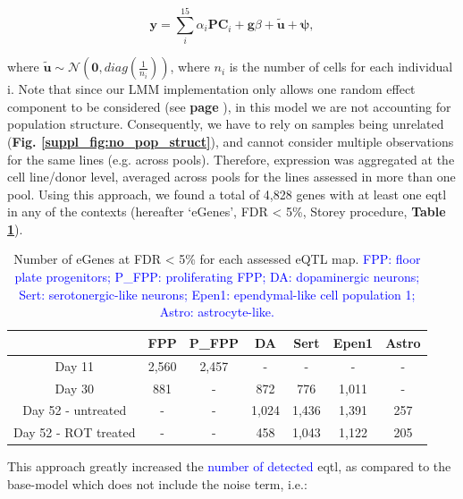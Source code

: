 \begin{equation}\label{eq:neuroseq_ncell}
    \mathbf{y} = \sum_i^{15}\alpha_i \mathbf{PC}_i + \mathbf{g}\beta + \tilde{\mathbf{u}} + \boldsymbol{\psi}, 
\end{equation}

where $\tilde{\mathbf{u}} \sim \mathcal{N}(\mathbf{0}, diag(\frac{1}{n_i}))$, where $n_i$ is the number of cells for each individual i.
Note that since our LMM implementation only allows one random effect component to be considered (see\textbf{ page \pageref{sec:non_gaussian}}), in this model we are not accounting for population structure.
Consequently, we have to rely on samples being unrelated (\textbf{Fig. \ref{suppl_fig:no_pop_struct}}), and cannot consider multiple observations for the same lines (e.g. across pools). 
Therefore, expression was aggregated at the cell line/donor level, averaged across pools for the lines assessed in more than one pool. 
Using this approach, we found
a total of 4,828 genes with at least one \gls{eqtl} in any of the contexts (hereafter `eGenes', FDR < 5\%, Storey procedure, \textbf{Table \ref{tab:eqtl_results}}).

\begin{table}[h]
    \centering
    \begin{tabular}{c|c c c c c c}
    &         FPP & P\_FPP & DA & Sert & Epen1 & Astro \\
    \hline
    Day 11  & 2,560 & 2,457 & - & - & - & - \\
    Day 30  & 881 & - &  872 & 776 & 1,011 & -  \\
    Day 52 - untreated & - & - & 1,024 & 1,436 & 1,391 & 257 \\
    Day 52 - ROT treated & - & -  & 458 & 1,043 & 1,122 & 205 \\
    \end{tabular}
    \caption[Number of eGenes across contexts]{Number of eGenes at FDR < 5\% for each assessed eQTL map.
    \textcolor{blue}{FPP: floor plate progenitors; P\_FPP: proliferating FPP; DA: dopaminergic neurons; Sert: serotonergic-like neurons; Epen1: ependymal-like cell population 1; Astro: astrocyte-like.}}
    \label{tab:eqtl_results}
\end{table}


This approach greatly increased the \textcolor{blue}{number of detected} \gls{eqtl},
as compared to the base-model which does not include the noise term, i.e.:

